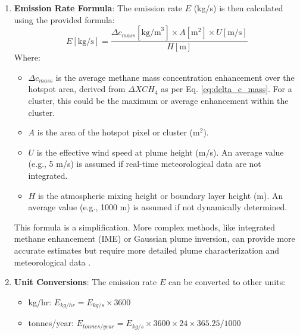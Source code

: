 \documentclass[12pt,a4paper]{article}
\begin{document}
\begin{enumerate}
    \item \textbf{Emission Rate Formula}: The emission rate $E$ (kg/s) is then calculated using the provided formula:
    \begin{equation}
        E [\text{kg/s}] = \frac{\Delta c_{mass} [\text{kg/m}^3] \times A [\text{m}^2] \times U [\text{m/s}]}{H [\text{m}]}
        \label{eq:emission_rate}
    \end{equation}
    Where:
    \begin{itemize}
        \item $\Delta c_{mass}$ is the average methane mass concentration enhancement over the hotspot area, derived from $\Delta XCH_4$ as per Eq. \ref{eq:delta_c_mass}. For a cluster, this could be the maximum or average enhancement within the cluster.
        \item $A$ is the area of the hotspot pixel or cluster (m$^2$).
        \item $U$ is the effective wind speed at plume height (m/s). An average value (e.g., 5 m/s) is assumed if real-time meteorological data are not integrated.
        \item $H$ is the atmospheric mixing height or boundary layer height (m). An average value (e.g., 1000 m) is assumed if not dynamically determined.
    \end{itemize}
    This formula is a simplification. More complex methods, like integrated methane enhancement (IME) or Gaussian plume inversion, can provide more accurate estimates but require more detailed plume characterization and meteorological data \citep{Varon2018}.

    \item \textbf{Unit Conversions}: The emission rate $E$ can be converted to other units:
    \begin{itemize}
        \item kg/hr: $E_{kg/hr} = E_{kg/s} \times 3600$
        \item tonnes/year: $E_{tonnes/year} = E_{kg/s} \times 3600 \times 24 \times 365.25 / 1000$
    \end{itemize}
\end{enumerate}
\end{document}
